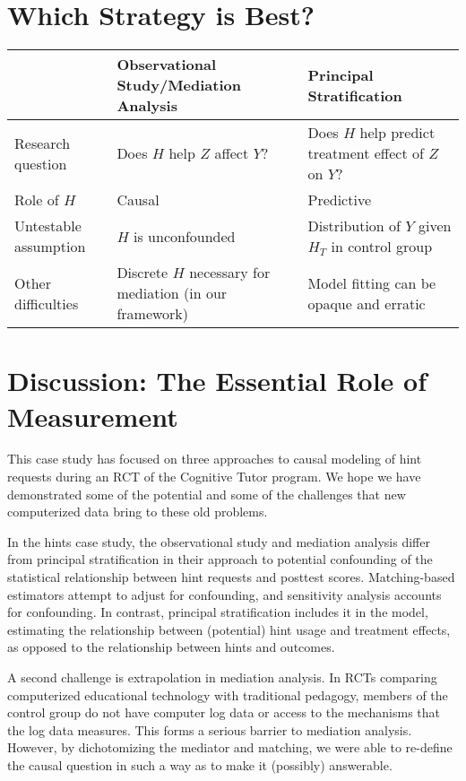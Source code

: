\documentclass{article}
\begin{document}
\section{Which Strategy is Best?}

\begin{table}
\begin{tabular}{p{1in}p{2in}p{2in}}
& Observational Study/Mediation Analysis &Principal Stratification\\
\hline
Research question & Does $H$ help $Z$ affect $Y$? & Does $H$ help predict
                                           treatment effect of $Z$ on $Y$?\\
\hline
Role of $H$ & Causal & Predictive\\
\hline
Untestable assumption & $H$ is unconfounded & Distribution of $Y$
                                              given $H_T$ in control
                                              group\\
\hline
Other difficulties & Discrete $H$ necessary for mediation (in our
                     framework) & Model fitting can be opaque and
                                  erratic\\
\end{tabular}
\end{table}


\section{Discussion: The Essential Role of Measurement}\label{sec:conclusion}
This case study has focused on three approaches to causal modeling of
hint requests during an RCT of the Cognitive Tutor program.
We hope we have demonstrated some of the potential and some of the
challenges that new computerized data bring to these old problems.

In the hints case study, the observational study and mediation
analysis differ from principal stratification in their approach to
potential confounding of the statistical relationship between hint
requests and posttest scores.
Matching-based estimators attempt to adjust for confounding,
and sensitivity analysis accounts for confounding.
In contrast, principal stratification includes it in the model,
estimating the relationship between (potential) hint usage and
treatment effects, as opposed to the relationship between hints and
outcomes.

A second challenge is extrapolation in mediation analysis.
In RCTs comparing computerized educational technology with traditional
pedagogy, members of the control group do not have computer log data
or access to the mechanisms that the log data measures.
This forms a serious barrier to mediation analysis.
However, by dichotomizing the mediator and matching, we were able to
re-define the causal question in such a way as to make it (possibly) answerable.
\end{document}
